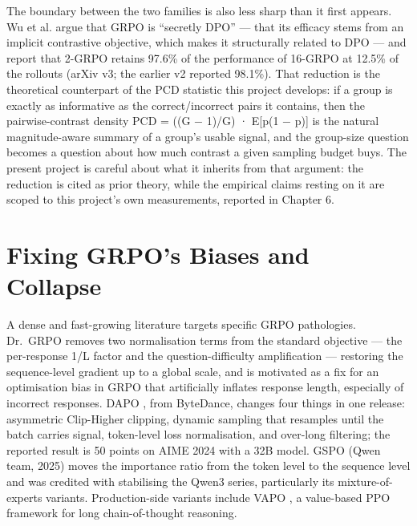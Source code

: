 \documentclass[12pt,a4paper]{report}
\begin{document}
The boundary between the two families is also less sharp than it first
appears. Wu et al. \citep{wu2025ittakestwo} argue that GRPO is
``secretly DPO'' --- that its efficacy stems from an implicit
contrastive objective, which makes it structurally related to DPO ---
and report that 2-GRPO retains 97.6\% of the performance of 16-GRPO at
12.5\% of the rollouts (arXiv v3; the earlier v2 reported 98.1\%). That
reduction is the theoretical counterpart of the PCD statistic this
project develops: if a group is exactly as informative as the
correct/incorrect pairs it contains, then the pairwise-contrast density
PCD = ((G − 1)/G) · E{[}p(1 − p){]} is the natural magnitude-aware
summary of a group's usable signal, and the group-size question becomes
a question about how much contrast a given sampling budget buys. The
present project is careful about what it inherits from that argument:
the reduction is cited as prior theory, while the empirical claims
resting on it are scoped to this project's own measurements, reported in
Chapter 6.

\section{Fixing GRPO's Biases and
Collapse}\label{fixing-grpos-biases-and-collapse}

A dense and fast-growing literature targets specific GRPO pathologies.
Dr.~GRPO \citep{liu2025understanding} removes two normalisation terms
from the standard objective --- the per-response 1/L factor and the
question-difficulty amplification --- restoring the sequence-level
gradient up to a global scale, and is motivated as a fix for an
optimisation bias in GRPO that artificially inflates response length,
especially of incorrect responses. DAPO \citep{yu2025dapo}, from
ByteDance, changes four things in one release: asymmetric Clip-Higher
clipping, dynamic sampling that resamples until the batch carries
signal, token-level loss normalisation, and over-long filtering; the
reported result is 50 points on AIME 2024 with a 32B model. GSPO
\citep{zheng2025gspo} (Qwen team, 2025) moves the importance ratio from
the token level to the sequence level and was credited with stabilising
the Qwen3 series, particularly its mixture-of-experts variants.
Production-side variants include VAPO \citep{yue2025vapo}, a value-based
PPO framework for long chain-of-thought reasoning.
\end{document}
